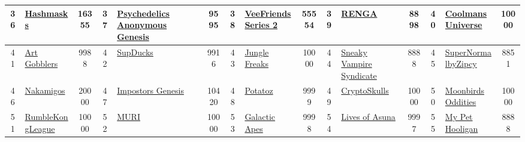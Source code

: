 \begin{table*}[]
{\begin{tabular}{|c|l|c|c|l|c|c|l|c|c|l|c|c|l|c|}
        36    & \href{https://www.thehashmasks.com/}{Hashmasks}                                    & 16355             & 37    & \href{https://psychedelicsanonymous.com/}{Psychedelics Anonymous Genesis}                         & 9595              & 38    & \href{https://series2.veefriends.com}{VeeFriends Series 2}                        & 55554             & 39    & \href{https://renga.app/}{RENGA}                                              & 8898              & 40    & \href{https://coolmansuniverse.com/}{CoolmansUniverse}                                    & 10000                                   \\ \hline
        41    & \href{https://artgobblers.com/}{Art Gobblers}                                      & 9988              & 42    & \href{https://www.supducks.com/}{SupDucks}                                                        & 9916              & 43    & \href{http://junglefreaks.io}{Jungle Freaks}                                      & 10000             & 44    & \href{https://svs.gg}{Sneaky Vampire Syndicate}                               & 8888              & 45    & \href{https://opensea.io/collection/slokh}{SuperNormalbyZipcy}                            & 8851                                    \\ \hline
        46    & \href{https://nakamigos.io/}{Nakamigos}                                            & 20000             & 47    & \href{https://impostors.gg}{Impostors Genesis}                                                    & 10420             & 48    & \href{https://www.memeland.com/potatoz}{Potatoz}                                  & 9999              & 49    & \href{https://cryptoskulls.com}{CryptoSkulls}                                 & 10000             & 50    & \href{https://www.oddities.xyz/}{Moonbirds Oddities}                                      & 10000                                   \\ \hline
        51    & \href{http://www.rumblekongleague.com}{RumbleKongLeague}                           & 10000             & 52    & \href{https://www.muri.soy/}{MURI}                                                                & 10000             & 53    & \href{https://opensea.io/collection/galacticapes}{Galactic Apes}                  & 9998              & 54    & \href{https://livesofasuna.com}{Lives of Asuna}                               & 9997              & 55    & \href{http://mypethooligan.com}{My Pet Hooligan}                                          & 8888                                    \\ \hline

\end{tabular}}
\end{table*}
